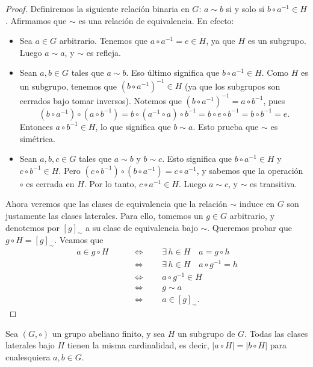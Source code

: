 \begin{proof}
Definiremos la siguiente relación binaria en $G$: $a \sim b$ si y solo si $b \circ a^{-1} \in H$. Afirmamos que $\sim$ es una relación de equivalencia. En efecto:
\begin{itemize}
\item Sea $a \in G$ arbitrario. Tenemos que $a \circ a^{-1} = e \in H$, ya que $H$ es un subgrupo. Luego $a \sim a$, y $\sim$ es refleja.
\item Sean $a, b \in G$ tales que $a \sim b$. Eso último significa que $b \circ a^{-1} \in H$. Como $H$ es un subgrupo, tenemos que $\left( b \circ a^{-1} \right)^{-1} \in H$ (ya que los subgrupos son cerrados bajo tomar inversos). Notemos que $\left( b \circ a^{-1} \right)^{-1} = a \circ b^{-1}$, pues
$$\left( b \circ a^{-1} \right) \circ \left(a \circ b^{-1} \right) = b \circ \left( a^{-1} \circ a \right) \circ b^{-1} = b \circ e \circ b^{-1} = b \circ b^{-1} = e.$$
Entonces $a \circ b^{-1} \in H$, lo que significa que $b \sim a$. Esto prueba que $\sim$ es simétrica.
\item Sean $a, b, c \in G$ tales que $a \sim b$ y $b \sim c$. Esto significa que $b \circ a^{-1} \in H$ y $c \circ b^{-1} \in H$. Pero $(c \circ b^{-1}) \circ (b \circ a^{-1}) = c \circ a^{-1}$, y sabemos que la operación
$\circ$ es cerrada en $H$. Por lo tanto, $c \circ a^{-1} \in H$. Luego
$a\sim c$, y $\sim$ es transitiva.
\end{itemize}
Ahora veremos que las clases de equivalencia que la relación $\sim$ induce en $G$ son justamente las clases laterales. Para ello, tomemos un $g \in G$ arbitrario, y denotemos por $\left[ g \right]_{\sim}$ a su clase de equivalencia bajo $\sim$. Queremos probar que $g \circ H = \left[ g \right]_\sim$. Veamos que
\begin{align*}
a \in g \circ H \qquad & \Leftrightarrow \qquad \exists\, h \in H \quad a = g \circ h \\
& \Leftrightarrow \qquad \exists\, h \in H \quad a \circ g^{-1} = h \\
& \Leftrightarrow \qquad a \circ g^{-1} \in H \\
& \Leftrightarrow \qquad g \sim a \\
& \Leftrightarrow \qquad a \in  \left[ g \right]_\sim.
\end{align*}
\end{proof}


\begin{prop} \label{cardinalidad_clases_laterales}
Sea $(G, \circ)$ un grupo abeliano finito, y sea $H$ un subgrupo de $G$. Todas las clases laterales bajo $H$ tienen la misma cardinalidad, es decir, $|a \circ H| = |b \circ H|$ para cualesquiera $a, b \in G$.
\end{prop}

